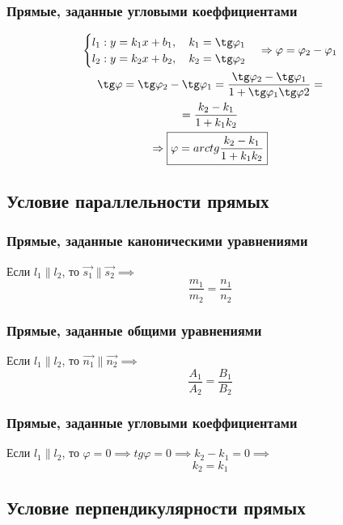 \subsubsection{Прямые, заданные угловыми коеффициентами}

\begin{gather*}
  \begin{cases}
    l_1: y = k_1 x + b_1, \quad k_1 = \tg \varphi_1 \\
    l_2: y = k_2 x + b_2, \quad k_2 = \tg \varphi_2
  \end{cases}
  \implies \varphi = \varphi_2 - \varphi_1 \\
  \tg \varphi = \tg \varphi_2 - \tg \varphi_1 = \frac{\tg \varphi_2 - \tg \varphi_1}{1 + \tg \varphi_1 \tg \varphi 2} =\\
  = \frac{k_2 - k_1}{1 + k_1 k_2} \\
  \implies \boxed{\varphi = arctg \frac{k_2 - k_1}{1 + k_1 k_2}}
\end{gather*}


\subsection{Условие параллельности прямых}

\subsubsection{Прямые, заданные каноническими уравнениями}

Если $l_1 \parallel l_2$, то $\vec{s_1} \parallel \vec{s_2} \implies$ \[
  \boxed{\frac{m_1}{m_2} = \frac{n_1}{n_2}}
\] 

\subsubsection{Прямые, заданные общими уравнениями}

Если $l_1 \parallel l_2$, то $\vec{n_1} \parallel \vec{n_2} \implies$ \[
  \boxed{\frac{A_1}{A_2} = \frac{B_1}{B_2}}
\] 

\subsubsection{Прямые, заданные угловыми коеффициентами}

Если $l_1 \parallel l_2$, то $\varphi = 0 \implies tg \varphi = 0 \implies k_2 - k_1 = 0 \implies$ \[
  \boxed{k_2 = k_1}
\] 

\subsection{Условие перпендикулярности прямых}

